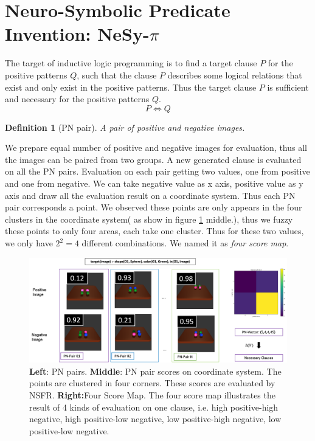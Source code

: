 \documentclass[
]{ceurart}
\newtheorem{definition}{Definition}[section]
\begin{document}
	\section{Neuro-Symbolic Predicate Invention: NeSy-$ \pi $}
	The target of inductive logic programming is to find a target clause $ P $ for the positive patterns $Q$, such that the clause $ P $ describes some logical relations that exist and only exist in the positive patterns. 
	Thus the target clause $ P $ is sufficient and necessary for the positive patterns $ Q $.
	\[ P\Leftrightarrow Q \]
	
	\begin{definition}[PN pair]
		A pair of positive and negative images.
	\end{definition}
	We prepare equal number of positive and negative images for evaluation, thus all the images can be paired from two groups.
	A new generated clause is evaluated on all the PN pairs. Evaluation on each pair getting two values, one from positive and one from negative. 
	We can take negative value as x axis, positive value as y axis and draw all the evaluation result on a coordinate system. Thus each PN pair corresponds a point. We observed these points are only appears in the four clusters in the coordinate system( as show in figure \ref{fig:pn-pair} middle.), thus we fuzzy these points to only four areas, each take one cluster. Thus for these two values, we only have $ 2^2=4 $ different combinations. We named it as \textit{four score map}.
	
	
	\begin{figure}[t]
		\centering
		\begin{minipage}{\textwidth}
			\includegraphics[width=\linewidth]{img/four_zone_explain.png} 
			\caption{\textbf{Left}: PN pairs. \textbf{Middle}: PN pair scores on coordinate system. The points are clustered in four corners. These scores are evaluated by NSFR. \textbf{Right:}Four Score Map. The four score map illustrates the result of 4 kinds of evaluation on one clause, i.e. high positive-high negative, high positive-low negative, low positive-high negative, low positive-low negative. }
			\label{fig:pn-pair}
		\end{minipage}
	\end{figure}
\end{document}
